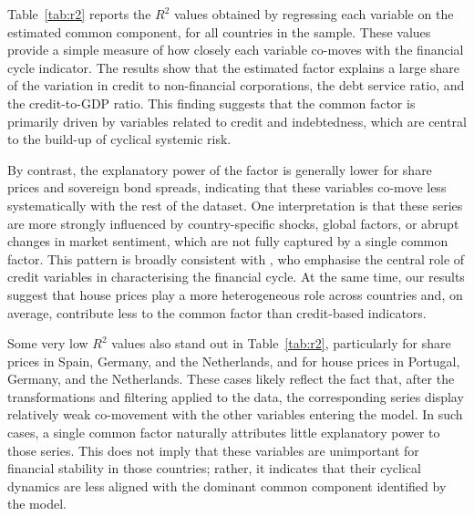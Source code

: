 Table~\ref{tab:r2} reports the $R^2$ values obtained by regressing each variable on the estimated common component, for all countries in the sample. These values provide a simple measure of how closely each variable co-moves with the financial cycle indicator. The results show that the estimated factor explains a large share of the variation in credit to non-financial corporations, the debt service ratio, and the credit-to-GDP ratio. This finding suggests that the common factor is primarily driven by variables related to credit and indebtedness, which are central to the build-up of cyclical systemic risk.

By contrast, the explanatory power of the factor is generally lower for share prices and sovereign bond spreads, indicating that these variables co-move less systematically with the rest of the dataset. One interpretation is that these series are more strongly influenced by country-specific shocks, global factors, or abrupt changes in market sentiment, which are not fully captured by a single common factor. This pattern is broadly consistent with \citet{drehmann2012characterising}, who emphasise the central role of credit variables in characterising the financial cycle. At the same time, our results suggest that house prices play a more heterogeneous role across countries and, on average, contribute less to the common factor than credit-based indicators.

Some very low $R^2$ values also stand out in Table~\ref{tab:r2}, particularly for share prices in Spain, Germany, and the Netherlands, and for house prices in Portugal, Germany, and the Netherlands. These cases likely reflect the fact that, after the transformations and filtering applied to the data, the corresponding series display relatively weak co-movement with the other variables entering the model. In such cases, a single common factor naturally attributes little explanatory power to those series. This does not imply that these variables are unimportant for financial stability in those countries; rather, it indicates that their cyclical dynamics are less aligned with the dominant common component identified by the model.

